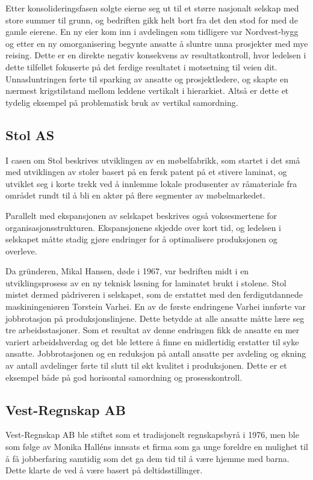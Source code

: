 \documentclass[norsk]{article}
\begin{document}
Etter konsolideringsfasen solgte eierne seg ut til et større nasjonalt selskap med store summer til grunn, og bedriften gikk helt bort fra det den stod for med de gamle eierene. En ny eier kom inn i avdelingen som tidligere var Nordvest-bygg og etter en ny omorganisering begynte ansatte å sluntre unna prosjekter med mye reising. Dette er en direkte negativ konsekvens av resultatkontroll, hvor ledelsen i dette tilfellet fokuserte på det ferdige resultatet i motsetning til veien dit. Unnasluntringen førte til sparking av ansatte og prosjektledere, og skapte en nærmest krigstilstand mellom leddene vertikalt i hierarkiet. Altså er dette et tydelig eksempel på problematisk bruk av vertikal samordning.

\subsection{Stol AS}
I casen om Stol beskrives utviklingen av en møbelfabrikk, som startet i det små med utviklingen av stoler basert på en fersk patent på et stivere laminat, og utviklet seg i korte trekk ved å innlemme lokale produsenter av råmateriale fra området rundt til å bli en aktør på flere segmenter av møbelmarkedet.

Parallelt med ekspansjonen av selskapet beskrives også voksesmertene for organisasjonsstrukturen. Ekspansjonene skjedde over kort tid, og ledelsen i selskapet måtte stadig gjøre endringer for å optimalisere produksjonen og overleve.

Da gründeren, Mikal Hansen, døde i 1967, var bedriften midt i en utviklingsprosess av en ny teknisk løsning for laminatet brukt i stolene. Stol mistet dermed pådriveren i selskapet, som de erstattet med den ferdigutdannede maskiningeniøren Torstein Varhei. En av de første endringene Varhei innførte var jobbrotasjon på produksjonslinjene. Dette betydde at alle ansatte måtte lære seg tre arbeidsstasjoner. Som et resultat av denne endringen fikk de ansatte en mer variert arbeidshverdag og det ble lettere å finne en midlertidig erstatter til syke ansatte. Jobbrotasjonen og en reduksjon på antall ansatte per avdeling og økning av antall avdelinger førte til slutt til økt kvalitet i produksjonen. Dette er et eksempel både på god horisontal samordning og prosesskontroll.

\subsection{Vest-Regnskap AB}
Vest-Regnskap AB ble stiftet som et tradisjonelt regnskapsbyrå i 1976, men ble som følge av Monika Halléns innsats et firma som ga unge foreldre en mulighet til å få jobberfaring samtidig som det ga dem tid til å være hjemme med barna. Dette klarte de ved å være basert på deltidsstillinger. 
\end{document}

